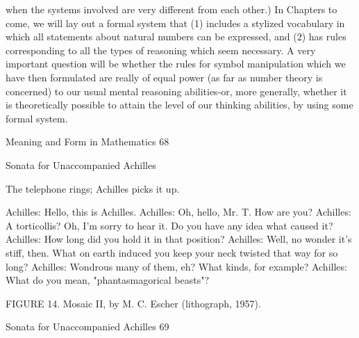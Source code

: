 when the systems involved are very different from each other.)
         In Chapters to come, we will lay out a formal system that (1) includes a stylized
vocabulary in which all statements about natural numbers can be expressed, and (2) has
rules corresponding to all the types of reasoning which seem necessary. A very important
question will be whether the rules for symbol manipulation which we have then
formulated are really of equal power (as far as number theory is concerned) to our usual
mental reasoning abilities-or, more generally, whether it is theoretically possible to attain
the level of our thinking abilities, by using some formal system.




Meaning and Form in Mathematics                                                           68

                             Sonata
                   for Unaccompanied Achilles

                    The telephone rings; Achilles picks it up.

Achilles: Hello, this is Achilles.
Achilles: Oh, hello, Mr. T. How are you?
Achilles: A torticollis? Oh, I'm sorry to hear it. Do you have any idea what caused it?
Achilles: How long did you hold it in that position?
Achilles: Well, no wonder it's stiff, then. What on earth induced you keep your neck
       twisted that way for so long?
Achilles: Wondrous many of them, eh? What kinds, for example? Achilles: What do you
       mean, "phantasmagorical beasts"?

              FIGURE 14. Mosaic II, by M. C. Escher (lithograph, 1957).




Sonata for Unaccompanied Achilles                                                   69

